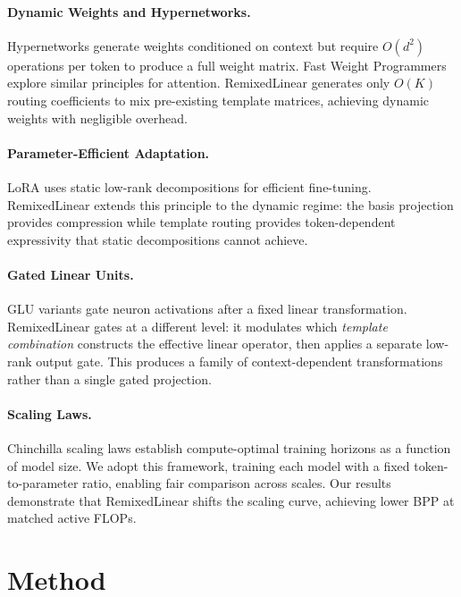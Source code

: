 \documentclass{article}
\begin{document}
\paragraph{Dynamic Weights and Hypernetworks.}
Hypernetworks \citep{ha2016hypernetworks} generate weights conditioned on context but require $O(d^2)$ operations per token to produce a full weight matrix. Fast Weight Programmers \citep{schlag2021linear} explore similar principles for attention. RemixedLinear generates only $O(K)$ routing coefficients to mix pre-existing template matrices, achieving dynamic weights with negligible overhead.

\paragraph{Parameter-Efficient Adaptation.}
LoRA \citep{hu2021lora} uses static low-rank decompositions for efficient fine-tuning. RemixedLinear extends this principle to the dynamic regime: the basis projection provides compression while template routing provides token-dependent expressivity that static decompositions cannot achieve.

\paragraph{Gated Linear Units.}
GLU variants \citep{dauphin2017language, shazeer2020glu} gate neuron activations after a fixed linear transformation. RemixedLinear gates at a different level: it modulates which \emph{template combination} constructs the effective linear operator, then applies a separate low-rank output gate. This produces a family of context-dependent transformations rather than a single gated projection.

\paragraph{Scaling Laws.}
Chinchilla scaling laws \citep{hoffmann2022training} establish compute-optimal training horizons as a function of model size. We adopt this framework, training each model with a fixed token-to-parameter ratio, enabling fair comparison across scales. Our results demonstrate that RemixedLinear shifts the scaling curve, achieving lower BPP at matched active FLOPs.

\section{Method}
\end{document}
